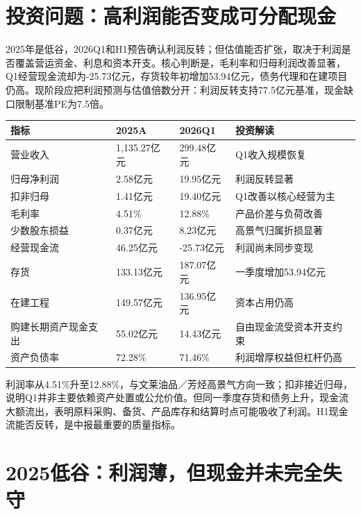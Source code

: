\section{投资问题：高利润能否变成可分配现金}

2025年是低谷，2026Q1和H1预告确认利润反转；但估值能否扩张，取决于利润是否覆盖营运资金、利息和资本开支。核心判断是，毛利率和归母利润改善显著，Q1经营现金流却为-25.73亿元，存货较年初增加53.94亿元，债务代理和在建项目仍高。现阶段应把利润预测与估值倍数分开：利润反转支持77.5亿元基准，现金缺口限制基准PE为7.5倍。

\begin{exhibitbox}[财务质量总览]
\noindent\begin{tabularx}{\textwidth}{L{3.25cm}R{2.1cm}R{2.1cm}X}
\toprule
\textbf{指标} & \textbf{2025A} & \textbf{2026Q1} & \textbf{投资解读} \\
\midrule
营业收入 & 1,135.27亿元 & 299.48亿元 & Q1收入规模恢复 \\
归母净利润 & 2.58亿元 & 19.95亿元 & 利润反转显著 \\
扣非归母 & 1.41亿元 & 19.40亿元 & Q1改善以核心经营为主 \\
毛利率 & 4.51\% & 12.88\% & 产品价差与负荷改善 \\
少数股东损益 & 0.37亿元 & 8.23亿元 & 高景气归属折损显著 \\
经营现金流 & 46.25亿元 & -25.73亿元 & 利润尚未同步变现 \\
存货 & 133.13亿元 & 187.07亿元 & 一季度增加53.94亿元 \\
在建工程 & 149.57亿元 & 136.95亿元 & 资本占用仍高 \\
购建长期资产现金支出 & 55.02亿元 & 14.43亿元 & 自由现金流受资本开支约束 \\
资产负债率 & 72.28\% & 71.46\% & 利润增厚权益但杠杆仍高 \\
\bottomrule
\end{tabularx}
\end{exhibitbox}

利润率从4.51\%升至12.88\%，与文莱油品／芳烃高景气方向一致；扣非接近归母，说明Q1并非主要依赖资产处置或公允价值。但同一季度存货和债务上升，现金流大额流出，表明原料采购、备货、产品库存和结算时点可能吸收了利润。H1现金流能否反转，是中报最重要的质量指标。

\section{2025低谷：利润薄，但现金并未完全失守}

